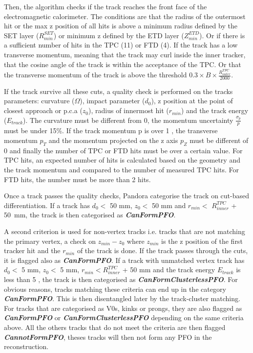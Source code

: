 Then, the algorithm checks if the track reaches the front face of the electromagnetic calorimeter. The conditions are that the radius of the outermost hit or the max z position of all hits is above a minimum radius defined by the SET layer ($R^{SET}_{min}$) or minimum z defined by the ETD layer ($Z^{ETD}_{min}$). Or if there is a sufficient number of hits in the TPC (11) or FTD (4). If the track has a low transverse momentum, meaning that the track may curl inside the inner tracker, that the cosine angle of the track is within the acceptance of the TPC. Or that the transverse momentum of the track is above the threshold $0.3 \times B \times \frac{R^{TPC}_{outer}}{2000}$.

If the track survive all these cuts, a quality check is performed on the tracks parameters: curvature ($\Omega$), impact parameter ($d_0$), z position at the point of closest approach or p.c.a ($z_0$), radius of innermost hit ($r_{min}$) and the track energy ($E_{track}$). The curvature must be different from 0, the momentum uncertainty $\frac{\sigma_p}{p}$ must be under 15\%. If the track momentum p is over 1 \GeV, the transverse momentum $p_T$ and the momentum projected on the z axis $p_Z$ must be different of 0 \GeV and finally the number of TPC or FTD hits must be over a certain value. For TPC hits, an expected number of hits is calculated based on the geometry and the track momentum and compared to the number of measured TPC hits. For FTD hits, the number must be more than 2 hits.

Once a track passes the quality checks, Pandora categorise the track on cut-based differentiation. If a track has  $d_0 <$ 50 mm, $z_0 <$ 50 mm and $r_{min} <$ $R^{TPC}_{inner}$ + \SI{50}{\milli\meter}, the track is then categorised as \textit{\textbf{CanFormPFO}}.

A second criterion is used for non-vertex tracks i.e. tracks that are not matching the primary vertex, a check on $z_{min} - z_0$ where $z_{min}$ is the z position of the first tracker hit and the $r_{min}$ of the track is done. If the track passes through the cuts, it is flagged also as \textit{\textbf{CanFormPFO}}. If a track with unmatched vertex track has $d_0 <$ 5 mm, $z_0 <$ 5 mm, $r_{min} < R^{TPC}_{inner}$ + 50 mm and the track energy $E_{track}$ is less than 5 \GeV, the track is then categorised as \textit{\textbf{CanFormClusterlessPFO}}. For obvious reasons, tracks matching these criteria can end up in the category \textit{\textbf{CanFormPFO}}. This is then disentangled later by the track-cluster matching. For tracks that are categorised as V0s, kinks or prongs, they are also flagged as \textit{\textbf{CanFormPFO}} or \textit{\textbf{CanFormClusterlessPFO}} depending on the same criteria above. All the others tracks that do not meet the criteria are then flagged \textit{\textbf{CannotFormPFO}}, theses tracks will then not form any PFO in the reconstruction.

